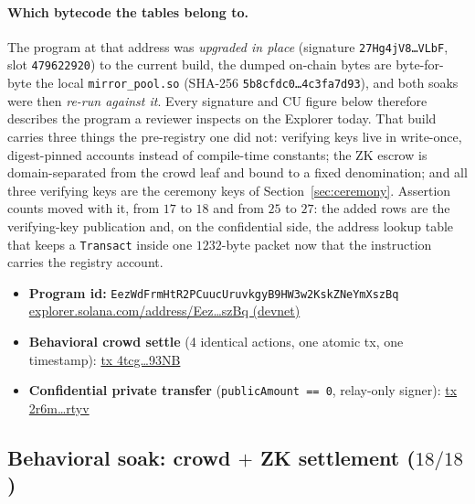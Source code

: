 \documentclass[10pt]{article}
\newcommand{\code}[1]{\texttt{#1}}
\begin{document}
\paragraph{Which bytecode the tables belong to.} The program at that address was
\emph{upgraded in place} (signature \code{27Hg4jV8\ldots VLbF}, slot
\code{479622920}) to the current build, the dumped on-chain bytes are byte-for-byte
the local \code{mirror\_pool.so} (SHA-256 \code{5b8cfdc0\ldots 4c3fa7d93}), and both
soaks were then \emph{re-run against it}. Every signature and CU figure below
therefore describes the program a reviewer inspects on the Explorer today. That
build carries three things the pre-registry one did not: verifying keys live in
write-once, digest-pinned accounts instead of compile-time constants; the ZK escrow
is domain-separated from the crowd leaf and bound to a fixed denomination; and all
three verifying keys are the ceremony keys of Section~\ref{sec:ceremony}. Assertion
counts moved with it, from $17$ to $18$ and from $25$ to $27$: the added rows are
the verifying-key publication and, on the confidential side, the address lookup
table that keeps a \code{Transact} inside one $1232$-byte packet now that the
instruction carries the registry account.

\begin{itemize}[leftmargin=1.4em,itemsep=0.1em]
  \item \textbf{Program id:} \code{EezWdFrmHtR2PCuucUruvkgyB9HW3w2KskZNeYmXszBq}\\
        \href{https://explorer.solana.com/address/EezWdFrmHtR2PCuucUruvkgyB9HW3w2KskZNeYmXszBq?cluster=devnet}{explorer.solana.com/address/Eez\ldots szBq (devnet)}
  \item \textbf{Behavioral crowd settle} (4 identical actions, one atomic tx, one
        timestamp):
        \href{https://explorer.solana.com/tx/4tcgNnhbZe7YKM26F6SnXW1WctASqVEqQ9W4v4NQ85fDfkYe3eq7YqCr4n7bEogm7U5By17Lkc5Tqa7jmZx693NB?cluster=devnet}{tx 4tcg\ldots 93NB}
  \item \textbf{Confidential private transfer} (\code{publicAmount == 0}, relay-only signer):
        \href{https://explorer.solana.com/tx/2r6mo2YrDtjJP8bnVqRJXaVDgVLkxaAmtKAHvgkwYvWb8rchvd63QinFqbmuj5Gk2Se8M9g9ajcCkC5R6QNprtyv?cluster=devnet}{tx 2r6m\ldots rtyv}
\end{itemize}

\subsection{Behavioral soak: crowd $+$ ZK settlement ($18/18$)}
\end{document}
